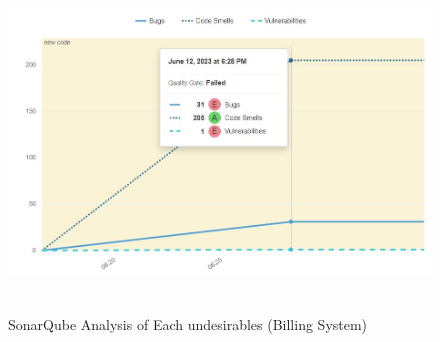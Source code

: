 \documentclass[12pt,letterpaper]{report}
\begin{document}
\begin{figure}
    \centering
    \includegraphics[width=0.7\linewidth]{Images/Issue_commit.jpg}\
    \caption{SonarQube Analysis of Each undesirables (Billing System)}
    \label{fig:enter-label}
\end{figure}
\pagebreak

\end{document}
